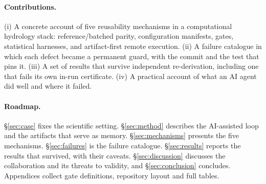 \paragraph{Contributions.}
(i) A concrete account of five reusability mechanisms in a computational
hydrology stack: reference/batched parity, configuration manifests, gates,
statistical harnesses, and artifact-first remote execution. (ii) A failure
catalogue in which each defect became a permanent guard, with the commit and
the test that pins it. (iii) A set of results that survive independent
re-derivation, including one that fails its own in-run certificate. (iv) A
practical account of what an AI agent did well and where it failed.

\paragraph{Roadmap.}
\S\ref{sec:case} fixes the scientific setting. \S\ref{sec:method} describes the
AI-assisted loop and the artifacts that serve as memory. \S\ref{sec:mechanisms}
presents the five mechanisms. \S\ref{sec:failures} is the failure catalogue.
\S\ref{sec:results} reports the results that survived, with their caveats.
\S\ref{sec:discussion} discusses the collaboration and its threats to validity,
and \S\ref{sec:conclusion} concludes. Appendices collect gate definitions,
repository layout and full tables.
